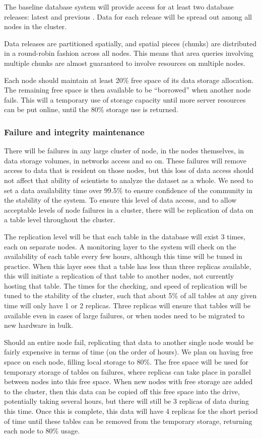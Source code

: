 \documentclass[DM,toc]{lsstdoc}
\begin{document}
The baseline database system will provide access for at least two database
releases: latest and previous . Data for each release will be spread out
among all nodes in the cluster.

Data releases are partitioned spatially, and spatial pieces (chunks) are
distributed in a round-robin fashion across all nodes. This means that
area queries involving multiple chunks are almost guaranteed to involve
resources on multiple nodes.

Each node should maintain at least 20\% free space of its data storage
allocation. The remaining free space is then available to be
``borrowed'' when another node fails. This will a temporary use of
storage capacity until more server resources can be put online, until
the 80\% storage use is returned.

\subsubsection{Failure and integrity
maintenance}\label{failure-and-integrity-maintenance}

There will be failures in any large cluster of node, in the nodes
themselves, in data storage volumes, in networks access and so on. These
failures will remove access to data that is resident on those nodes, but
this loss of data access should not affect that ability of scientists to
analyze the dataset as a whole. We need to set a data availability time
over 99.5\% to ensure confidence of the community in the stability of
the system. To ensure this level of data access, and to allow acceptable
levels of node failures in a cluster, there will be replication of data
on a table level throughout the cluster.

The replication level will be that each table in the database will exist
3 times, each on separate nodes. A monitoring layer to the system will
check on the availability of each table every few hours, although this
time will be tuned in practice. When this layer sees that a table has
less than three replicas available, this will initiate a replication of
that table to another nodes, not currently hosting that table. The times
for the checking, and speed of replication will be tuned to the
stability of the cluster, such that about 5\% of all tables at any given
time will only have 1 or 2 replicas. Three replicas will ensure that
tables will be available even in cases of large failures, or when nodes
need to be migrated to new hardware in bulk.

Should an entire node fail, replicating that data to another single node would
be fairly expensive in terms of time (on the order of hours).  We plan on
having free space on each node, filling local storage to 80\%. The free space
will be used for temporary storage of tables on failures, where replicas can
take place in parallel between nodes into this free space. When new nodes with
free storage are added to the cluster, then this data can be copied off this
free space into the drive, potentially taking several hours, but there will
still be 3 replicas of data during this time. Once this is complete, this data
will have 4 replicas for the short period of time until these tables can be
removed from the temporary storage, returning each node to 80\% usage.
\end{document}
